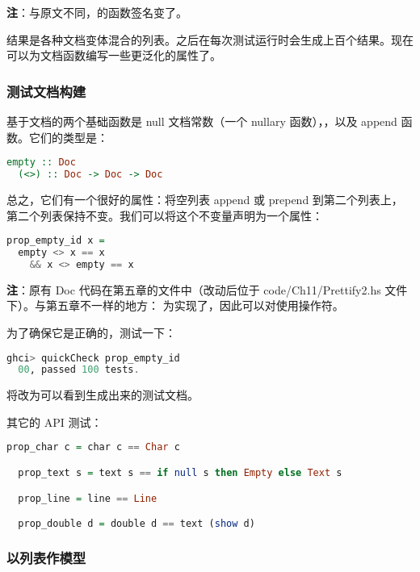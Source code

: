 \documentclass[./main.tex]{subfiles}
\begin{document}
\textbf{注}：与原文不同，的函数签名变了。

结果是各种文档变体混合的列表。之后在每次测试运行时会生成上百个结果。现在可以为文档函数编写一些更泛化的属性了。

\subsubsection*{测试文档构建}

基于文档的两个基础函数是 null 文档常数（一个 nullary 函数），，以及 append 函数。它们的类型是：

\begin{lstlisting}[language=Haskell]
  empty :: Doc
  (<>) :: Doc -> Doc -> Doc
\end{lstlisting}

总之，它们有一个很好的属性：将空列表 append 或 prepend 到第二个列表上，第二个列表保持不变。我们可以将这个不变量声明为一个属性：

\begin{lstlisting}[language=Haskell]
  prop_empty_id x =
  empty <> x == x
    && x <> empty == x
\end{lstlisting}

\textbf{注}：原有 Doc 代码在第五章的文件中（改动后位于 code/Ch11/Prettify2.hs 文件下）。与第五章不一样的地方：
为实现了，因此可以对使用操作符\acode{(<>)}。

为了确保它是正确的，测试一下：

\begin{lstlisting}[language=Haskell]
  ghci> quickCheck prop_empty_id
  00, passed 100 tests.
\end{lstlisting}

将改为可以看到生成出来的测试文档。

其它的 API 测试：

\begin{lstlisting}[language=Haskell]
  prop_char c = char c == Char c

  prop_text s = text s == if null s then Empty else Text s

  prop_line = line == Line

  prop_double d = double d == text (show d)
\end{lstlisting}

\subsubsection*{以列表作模型}
\end{document}
